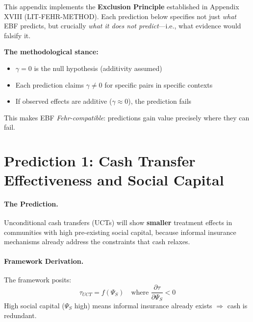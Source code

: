 \begin{tcolorbox}[colback=blue!5!white, colframe=blue!75!black,
    title=\textbf{Connection to Appendix XVIII: The Exclusion Principle}]
This appendix implements the \textbf{Exclusion Principle} established in Appendix XVIII
(LIT-FEHR-METHOD). Each prediction below specifies not just \textit{what} EBF predicts,
but crucially \textit{what it does not predict}---i.e., what evidence would falsify it.

\textbf{The methodological stance:}
\begin{itemize}[noitemsep]
    \item $\gamma = 0$ is the null hypothesis (additivity assumed)
    \item Each prediction claims $\gamma \neq 0$ for specific pairs in specific contexts
    \item If observed effects are additive ($\gamma \approx 0$), the prediction fails
\end{itemize}

This makes EBF \textit{Fehr-compatible}: predictions gain value precisely where they can fail.
\end{tcolorbox}


\section{Prediction 1: Cash Transfer Effectiveness and Social Capital}
\label{sec:S-prediction1}

\paragraph{The Prediction.}
Unconditional cash transfers (UCTs) will show \textbf{smaller} treatment effects in communities with high pre-existing social capital, because informal insurance mechanisms already address the constraints that cash relaxes.

\paragraph{Framework Derivation.}
The framework posits:
\begin{equation}
    \tau_{UCT} = f(\Psi_S) \quad \text{where } \frac{\partial \tau}{\partial \Psi_S} < 0
\end{equation}
High social capital ($\Psi_S$ high) means informal insurance already exists $\Rightarrow$ cash is redundant.

